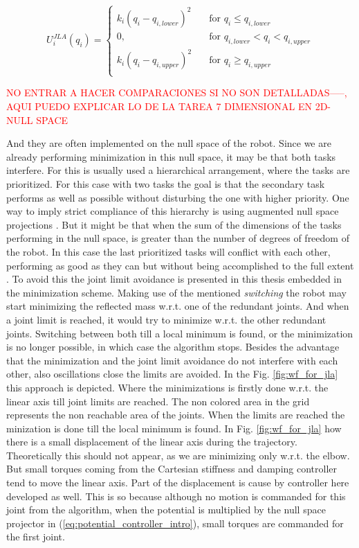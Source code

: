 \begin{equation} 
U_i^{JLA}(q_i) = 
\begin{cases}
k_{i} (q_{i} - q_{i,lower})^{2} &\quad\text{for \ }  q_i\le q_{i,lower}\\
\text{0,} &\quad\text{for \ } q_{i,lower} < q_i < q_{i,upper}\\
k_{i} (q_{i} - q_{i,upper})^{2} &\quad\text{for \ }  q_i\ge q_{i,upper}\\
\end{cases}
\label{eq:JLA_dietrich}
\end{equation}



\textcolor{red}{NO ENTRAR A HACER COMPARACIONES SI NO SON DETALLADAS-----, AQUI PUEDO EXPLICAR LO DE LA TAREA 7 DIMENSIONAL EN 2D-NULL SPACE}

And they are often implemented on the null space of the robot. Since we are already performing minimization in this null space, it may be that both tasks interfere. For this is usually used a hierarchical arrangement, where the tasks are prioritized. For this case with two tasks the goal is that the secondary task performs as well as possible without disturbing the one with higher priority. One way to imply strict compliance of this hierarchy is using augmented null space projections \cite{JLA_5}. But it might be that when the sum of the dimensions of the tasks performing in the null space, is greater than the number of degrees of freedom of the robot. In this case the last prioritized tasks will conflict with each other,  performing as good as they can but without being accomplished to the full extent \cite{JLA_5}.
To avoid this the joint limit avoidance is presented in this thesis embedded in the minimization scheme. Making use of the mentioned \textit{switching} the robot may start minimizing the reflected mass w.r.t. one of the redundant joints. And when a joint limit is reached, it would try to minimize w.r.t. the other redundant joints. Switching between both till a local minimum is found, or the minimization is no longer possible, in which case the algorithm stops.
Besides the advantage that the minimization and the joint limit avoidance do not interfere with each other, also oscillations close the limits are avoided. In the Fig. \ref{fig:wf_for_jla} this approach is depicted. Where the minimizations is firstly done w.r.t. the linear axis till joint limits are reached. The non colored area in the grid represents the non reachable area of the joints. When the limits are reached the minization is done till the local minimum is found. In Fig. \ref{fig:wf_for_jla} how there is a  small displacement of the linear axis during the trajectory. Theoretically this should not appear, as we are minimizing only w.r.t. the elbow. But small torques coming from the Cartesian stiffness and damping controller tend to move the linear axis. Part of the displacement is cause by controller here developed as well. This is so because although no motion is commanded for this joint from the algorithm, when the potential is multiplied by the null space projector in (\ref{eq:potential_controller_intro}), small torques are commanded for the first joint.

